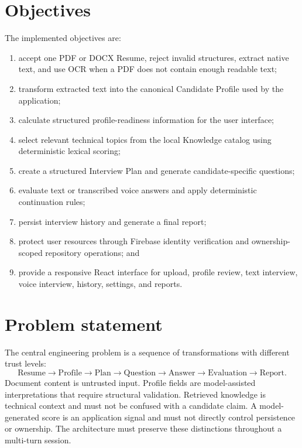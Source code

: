 \section{Objectives}

The implemented objectives are:
\begin{enumerate}
  \item accept one PDF or DOCX Resume, reject invalid structures, extract native text, and use OCR when a PDF does not contain enough readable text;
  \item transform extracted text into the canonical Candidate Profile used by the application;
  \item calculate structured profile-readiness information for the user interface;
  \item select relevant technical topics from the local Knowledge catalog using deterministic lexical scoring;
  \item create a structured Interview Plan and generate candidate-specific questions;
  \item evaluate text or transcribed voice answers and apply deterministic continuation rules;
  \item persist interview history and generate a final report;
  \item protect user resources through Firebase identity verification and ownership-scoped repository operations; and
  \item provide a responsive React interface for upload, profile review, text interview, voice interview, history, settings, and reports.
\end{enumerate}

\section{Problem statement}

The central engineering problem is a sequence of transformations with different trust levels:
\begin{equation}
\text{Resume}\rightarrow\text{Profile}\rightarrow\text{Plan}\rightarrow\text{Question}\rightarrow\text{Answer}\rightarrow\text{Evaluation}\rightarrow\text{Report}.
\end{equation}
Document content is untrusted input. Profile fields are model-assisted interpretations that require structural validation. Retrieved knowledge is technical context and must not be confused with a candidate claim. A model-generated score is an application signal and must not directly control persistence or ownership. The architecture must preserve these distinctions throughout a multi-turn session.

